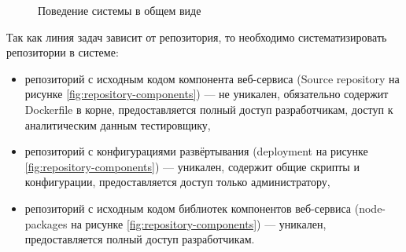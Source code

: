 \begin{figure}[h!]
    \caption{Поведение системы в общем виде}
    \label{fig:system-common}
\end{figure}

Так как линия задач зависит от репозитория, то необходимо систематизировать репозитории в системе:

\begin{itemize}
    \item репозиторий с исходным кодом компонента веб-сервиса (Source repository на рисунке \ref{fig:repository-components}) --- не уникален, обязательно содержит Dockerfile в корне,
        предоставляется полный доступ разработчикам, доступ к аналитическим данным тестировщику,
    \item репозиторий с конфигурациями развёртывания (deployment на рисунке \ref{fig:repository-components}) --- уникален, содержит общие скрипты и конфигурации, предоставляется доступ только администратору,
    \item репозиторий с исходным кодом библиотек компонентов веб-сервиса (node-packages на рисунке \ref{fig:repository-components}) --- уникален, предоставляется полный доступ разработчикам.
\end{itemize}

